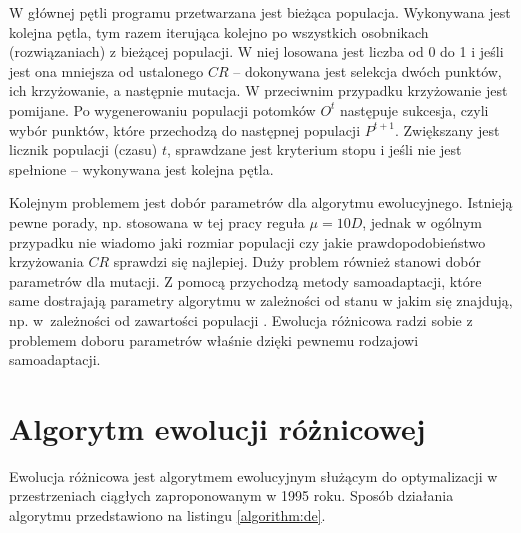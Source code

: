 \documentclass[a4paper,onecolumn,oneside,12pt,wide,floatssmall]{mwrep}
\theoremstyle{definition}
\theoremstyle{plain}%
\theoremstyle{remark}
\begin{document}
W głównej pętli programu przetwarzana jest bieżąca populacja. 
Wykonywana jest kolejna pętla, tym razem iterująca kolejno po wszystkich osobnikach 
(rozwiązaniach) z bieżącej populacji. W niej losowana jest liczba od 0 do 1 i jeśli jest ona mniejsza
od ustalonego $CR$ -- dokonywana jest selekcja dwóch punktów, ich krzyżowanie, a następnie mutacja.
W przeciwnim przypadku krzyżowanie jest pomijane.
Po wygenerowaniu populacji potomków $O^t$ następuje sukcesja, czyli wybór punktów, które przechodzą
do następnej populacji $P^{t+1}$. Zwiększany jest licznik populacji (czasu) $t$,
sprawdzane jest kryterium stopu i jeśli nie jest spełnione --
wykonywana jest kolejna pętla.
 
Kolejnym problemem jest dobór parametrów dla algorytmu ewolucyjnego. 
Istnieją pewne porady, np. stosowana w tej pracy reguła $\mu = 10D$, 
jednak w ogólnym przypadku nie wiadomo jaki rozmiar populacji czy jakie prawdopodobieństwo
krzyżowania $CR$ sprawdzi się najlepiej. Duży problem również stanowi dobór parametrów dla mutacji.
Z pomocą przychodzą
metody samoadaptacji, które same dostrajają parametry algorytmu w zależności od stanu w jakim się
znajdują, np. w~zależności od zawartości populacji \cite{brest}.
Ewolucja różnicowa radzi sobie z problemem doboru parametrów właśnie dzięki pewnemu rodzajowi
samoadaptacji.

\section{Algorytm ewolucji różnicowej}

Ewolucja różnicowa jest algorytmem ewolucyjnym służącym do optymalizacji
w przestrzeniach ciągłych zaproponowanym w 1995 roku. \cite{storn} Sposób działania algorytmu
przedstawiono na listingu \ref{algorithm:de}.

\usetikzlibrary{decorations.pathreplacing,calc}
\newcommand{\tikzmark}[1]{\tikz[overlay,remember picture] \node (#1) {};}

\newcommand*{\AddNote}[4]{%
    \begin{tikzpicture}[overlay, remember picture]
        \draw [decoration={brace,amplitude=0.5em},decorate,thick]
            ($(#3)!(#1.north)!($(#3)-(0,1)$)$) --  
            ($(#3)!(#2.south)!($(#3)-(0,1)$)$)
                node [align=center, text width=2.5cm, pos=0.5, anchor=west] {#4};
    \end{tikzpicture}
}%
\end{document}
